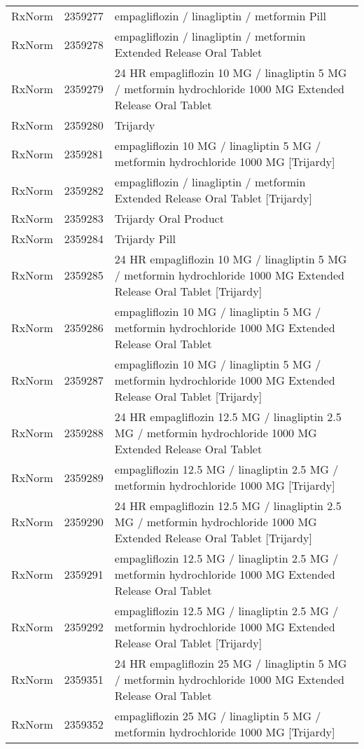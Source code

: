 \begin{longtable}{p{}p{}p{}}
  RxNorm & 2359277 & empagliflozin / linagliptin / metformin Pill \\ 
  RxNorm & 2359278 & empagliflozin / linagliptin / metformin Extended Release Oral Tablet \\ 
  RxNorm & 2359279 & 24 HR empagliflozin 10 MG / linagliptin 5 MG / metformin hydrochloride 1000 MG Extended Release Oral Tablet \\ 
  RxNorm & 2359280 & Trijardy \\ 
  RxNorm & 2359281 & empagliflozin 10 MG / linagliptin 5 MG / metformin hydrochloride 1000 MG [Trijardy] \\ 
  RxNorm & 2359282 & empagliflozin / linagliptin / metformin Extended Release Oral Tablet [Trijardy] \\ 
  RxNorm & 2359283 & Trijardy Oral Product \\ 
  RxNorm & 2359284 & Trijardy Pill \\ 
  RxNorm & 2359285 & 24 HR empagliflozin 10 MG / linagliptin 5 MG / metformin hydrochloride 1000 MG Extended Release Oral Tablet [Trijardy] \\ 
  RxNorm & 2359286 & empagliflozin 10 MG / linagliptin 5 MG / metformin hydrochloride 1000 MG Extended Release Oral Tablet \\ 
  RxNorm & 2359287 & empagliflozin 10 MG / linagliptin 5 MG / metformin hydrochloride 1000 MG Extended Release Oral Tablet [Trijardy] \\ 
  RxNorm & 2359288 & 24 HR empagliflozin 12.5 MG / linagliptin 2.5 MG / metformin hydrochloride 1000 MG Extended Release Oral Tablet \\ 
  RxNorm & 2359289 & empagliflozin 12.5 MG / linagliptin 2.5 MG / metformin hydrochloride 1000 MG [Trijardy] \\ 
  RxNorm & 2359290 & 24 HR empagliflozin 12.5 MG / linagliptin 2.5 MG / metformin hydrochloride 1000 MG Extended Release Oral Tablet [Trijardy] \\ 
  RxNorm & 2359291 & empagliflozin 12.5 MG / linagliptin 2.5 MG / metformin hydrochloride 1000 MG Extended Release Oral Tablet \\ 
  RxNorm & 2359292 & empagliflozin 12.5 MG / linagliptin 2.5 MG / metformin hydrochloride 1000 MG Extended Release Oral Tablet [Trijardy] \\ 
  RxNorm & 2359351 & 24 HR empagliflozin 25 MG / linagliptin 5 MG / metformin hydrochloride 1000 MG Extended Release Oral Tablet \\ 
  RxNorm & 2359352 & empagliflozin 25 MG / linagliptin 5 MG / metformin hydrochloride 1000 MG [Trijardy] \\ 

\end{longtable}
